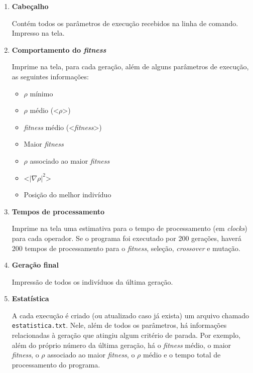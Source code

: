 \begin{enumerate}

	\item \textbf{Cabeçalho}
	
		Contém todos os parâmetros de execução recebidos na linha de comando. Impresso na tela.
	
	\item \textbf{Comportamento do \emph{fitness}}
	
		Imprime na tela, para cada geração, além de alguns parâmetros de execução, as seguintes informações: 
		
		\begin{itemize}
			\item $\rho$ mínimo
			\item $\rho$ médio (<$\rho$>)
			\item \emph{fitness} médio (<\emph{fitness}>)
			\item Maior \emph{fitness}
			\item $\rho$ associado ao maior \emph{fitness}
			\item <$|\nabla \rho|^2$>
			\item Posição do melhor indivíduo
		\end{itemize}

	\item \textbf{Tempos de processamento}
	
		Imprime na tela uma estimativa para o tempo de processamento (em \emph{clocks}) para cada operador. Se o programa foi executado por 200 gerações, haverá 200 tempos de processamento para o \emph{fitness}, seleção, \emph{crossover} e mutação.
		
	\item \textbf{Geração final}
	
				Impressão de todos os indivíduos da última geração. 
	
	\item \textbf{Estatística}
	
				A cada execução é criado (ou atualizado caso já exista) um arquivo chamado \texttt{estatistica.txt}. Nele, além de todos os parâmetros, há informações relacionadas à geração que atingiu algum critério de parada. Por exemplo, além do próprio número da última geração, há o \emph{fitness} médio, o maior \emph{fitness}, o $\rho$ associado ao maior \emph{fitness}, o $\rho$ médio e o tempo total de processamento do programa.
	
\end{enumerate}
	
